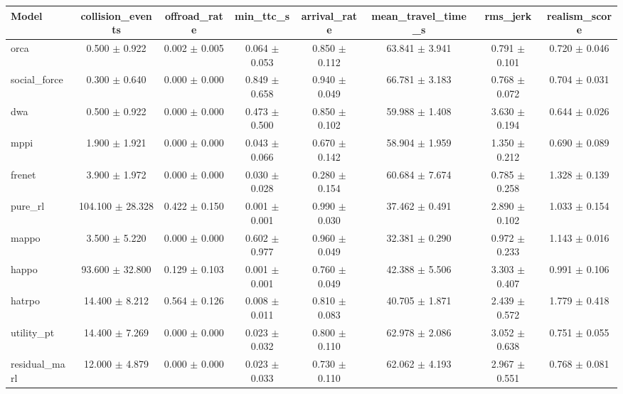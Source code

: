 \begin{tabular}{lccccccc}
\toprule
Model & collision\_events & offroad\_rate & min\_ttc\_s & arrival\_rate & mean\_travel\_time\_s & rms\_jerk & realism\_score \\
\midrule
orca & 0.500 $\pm$ 0.922 & 0.002 $\pm$ 0.005 & 0.064 $\pm$ 0.053 & 0.850 $\pm$ 0.112 & 63.841 $\pm$ 3.941 & 0.791 $\pm$ 0.101 & 0.720 $\pm$ 0.046 \\
social\_force & 0.300 $\pm$ 0.640 & 0.000 $\pm$ 0.000 & 0.849 $\pm$ 0.658 & 0.940 $\pm$ 0.049 & 66.781 $\pm$ 3.183 & 0.768 $\pm$ 0.072 & 0.704 $\pm$ 0.031 \\
dwa & 0.500 $\pm$ 0.922 & 0.000 $\pm$ 0.000 & 0.473 $\pm$ 0.500 & 0.850 $\pm$ 0.102 & 59.988 $\pm$ 1.408 & 3.630 $\pm$ 0.194 & 0.644 $\pm$ 0.026 \\
mppi & 1.900 $\pm$ 1.921 & 0.000 $\pm$ 0.000 & 0.043 $\pm$ 0.066 & 0.670 $\pm$ 0.142 & 58.904 $\pm$ 1.959 & 1.350 $\pm$ 0.212 & 0.690 $\pm$ 0.089 \\
frenet & 3.900 $\pm$ 1.972 & 0.000 $\pm$ 0.000 & 0.030 $\pm$ 0.028 & 0.280 $\pm$ 0.154 & 60.684 $\pm$ 7.674 & 0.785 $\pm$ 0.258 & 1.328 $\pm$ 0.139 \\
pure\_rl & 104.100 $\pm$ 28.328 & 0.422 $\pm$ 0.150 & 0.001 $\pm$ 0.001 & 0.990 $\pm$ 0.030 & 37.462 $\pm$ 0.491 & 2.890 $\pm$ 0.102 & 1.033 $\pm$ 0.154 \\
mappo & 3.500 $\pm$ 5.220 & 0.000 $\pm$ 0.000 & 0.602 $\pm$ 0.977 & 0.960 $\pm$ 0.049 & 32.381 $\pm$ 0.290 & 0.972 $\pm$ 0.233 & 1.143 $\pm$ 0.016 \\
happo & 93.600 $\pm$ 32.800 & 0.129 $\pm$ 0.103 & 0.001 $\pm$ 0.001 & 0.760 $\pm$ 0.049 & 42.388 $\pm$ 5.506 & 3.303 $\pm$ 0.407 & 0.991 $\pm$ 0.106 \\
hatrpo & 14.400 $\pm$ 8.212 & 0.564 $\pm$ 0.126 & 0.008 $\pm$ 0.011 & 0.810 $\pm$ 0.083 & 40.705 $\pm$ 1.871 & 2.439 $\pm$ 0.572 & 1.779 $\pm$ 0.418 \\
utility\_pt & 14.400 $\pm$ 7.269 & 0.000 $\pm$ 0.000 & 0.023 $\pm$ 0.032 & 0.800 $\pm$ 0.110 & 62.978 $\pm$ 2.086 & 3.052 $\pm$ 0.638 & 0.751 $\pm$ 0.055 \\
residual\_marl & 12.000 $\pm$ 4.879 & 0.000 $\pm$ 0.000 & 0.023 $\pm$ 0.033 & 0.730 $\pm$ 0.110 & 62.062 $\pm$ 4.193 & 2.967 $\pm$ 0.551 & 0.768 $\pm$ 0.081 \\
\bottomrule
\end{tabular}